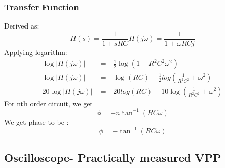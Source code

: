 \documentclass[a4paper,12pt]{article}
\begin{document}
\subsubsection{Transfer Function}
Derived as:
\begin{equation}
    H(s) = \frac{1}{1 + sRC}
    H(j\omega)=\frac{1}{1+\omega RCj}
\end{equation}
Applying logarithm:
\begin{align}
    \log |H(j\omega)| &= -\frac{1}{2}\log(1 + R^2C^2\omega^2)\\
    \log |H(j\omega)| &= -\log(RC)-\frac{1}{2}log(\frac{1}{R^2C^2}+\omega^2)\\
    20\log |H(j\omega)| &= -20log(RC) -10\log(\frac{1}{R^2C^2}+\omega^2)
\end{align}
For nth order circuit, we get 
\begin{equation}
    \phi = -n\tan^{-1}(RC\omega)
\end{equation}
We get phase to be :
\begin{equation}
    \phi =-\tan^{-1}(RC\omega)
\end{equation}
\subsection{Oscilloscope- Practically measured VPP}
\end{document}
